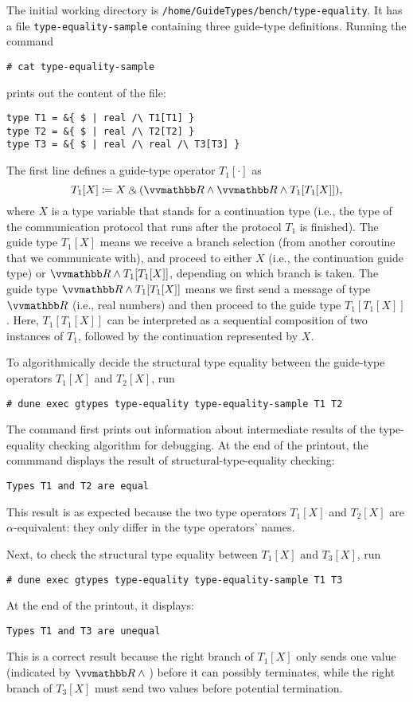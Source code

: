 The initial working directory is \texttt{/home/GuideTypes/bench/type-equality}.
%
It has a file \texttt{type-equality-sample} containing three guide-type
definitions.
%
Running the command
\begin{verbatim}
# cat type-equality-sample
\end{verbatim}
prints out the content of the file:
\begin{verbatim}
type T1 = &{ $ | real /\ T1[T1] }
type T2 = &{ $ | real /\ T2[T2] }
type T3 = &{ $ | real /\ real /\ T3[T3] }
\end{verbatim}
%
The first line defines a guide-type operator $T_1 [\cdot]$ as
\begin{equation*}
  T_1 [X] \coloneq X \echoice (\treal \land \treal \land T_1 [T_1[X]]),
\end{equation*}
where $X$ is a type variable that stands for a continuation type (i.e., the type
of the communication protocol that runs after the protocol $T_1$ is finished).
%
The guide type $T_1 [X]$ means we receive a branch selection (from another
coroutine that we communicate with), and proceed to either $X$ (i.e., the
continuation guide type) or $\treal \land T_1 [T_1[X]]$, depending on which
branch is taken.
%
The guide type $\treal \land T_1 [T_1[X]]$ means we first send a message of type
$\treal$ (i.e., real numbers) and then proceed to the guide type $T_1 [T_1
[X]]$.
%
Here, $T_1 [T_1 [X]]$ can be interpreted as a sequential composition of two
instances of $T_1$, followed by the continuation represented by $X$.

To algorithmically decide the structural type equality between the guide-type
operators $T_1 [X]$ and $T_2 [X]$, run
\begin{verbatim}
# dune exec gtypes type-equality type-equality-sample T1 T2
\end{verbatim}
%
The command first prints out information about intermediate results of the
type-equality checking algorithm for debugging.
%
At the end of the printout, the commmand displays the result of
structural-type-equality checking:
\begin{verbatim}
Types T1 and T2 are equal
\end{verbatim}
%
This result is as expected because the two type operators $T_1 [X]$ and $T_2
  [X]$ are $\alpha$-equivalent: they only differ in the type operators' names.

Next, to check the structural type equality between $T_1 [X]$ and $T_3 [X]$, run
\begin{verbatim}
# dune exec gtypes type-equality type-equality-sample T1 T3
\end{verbatim}
%
At the end of the printout, it displays:
\begin{verbatim}
Types T1 and T3 are unequal
\end{verbatim}
%
This is a correct result because the right branch of $T_1 [X]$ only sends one
value (indicated by $\treal \land {}$) before it can possibly terminates, while
the right branch of $T_3 [X]$ must send two values before potential termination.

